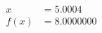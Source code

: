\documentclass[preview]{standalone}
\begin{document}
\begin{align*}
x &= 5.0004\\f(x) &= 8.0000000
\end{align*}
\end{document}
